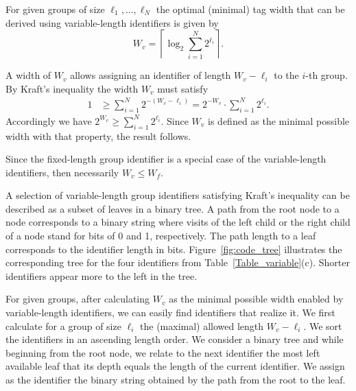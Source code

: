 \begin{property}
For given groups of size $\ell_1, \ldots, \ell_N$ the optimal (minimal) tag width that can be derived using variable-length identifiers is given by 
\begin{equation} \label{eq2}
W_{v}  = \left \lceil \log_2 \sum_{i = 1}^{N}{2^{\ell_i}} \right \rceil. \nonumber 
\end{equation}
\label{property_variable_length_minimal_tag}
\end{property} 
\bp A width of $W_{v}$ allows assigning an identifier of length $W_{v}
- \ell_i$ to the $i$-th group. By Kraft's inequality the width $W_{v}$
must satisfy
\begin{equation} \label{eq1}
\begin{split}
1 &\ge \sum_{i = 1}^{N}{2^{-(W_{v}-\ell_i)}} = 2^{-W_{v}} \cdot \sum_{i = 1}^{N}{2^{\ell_i}}. \nonumber 
\end{split}
\end{equation}
Accordingly we have $2^{W_{v}}  \ge \sum_{i = 1}^{N}{2^{\ell_i}}$. Since $W_{v}$ is defined as the minimal possible width with that property, the result follows.
\ep

 
Since the fixed-length group identifier is a special case of the
variable-length identifiers, then necessarily $W_{v} \le W_{f}$.

A selection of variable-length group identifiers satisfying Kraft's inequality can be described as a subset of leaves in a binary tree. 
A path from the root node to a node corresponds to a binary string where visits of the left child or the right child of a node stand for bits of 0 and 1, respectively. 
The path length  to a leaf corresponds to the identifier length in bits.
Figure~\ref{fig:code_tree} illustrates the corresponding tree for the four identifiers from Table~\ref{Table_variable}(c).
Shorter identifiers appear more to the left in the tree.

For given groups, after calculating $W_{v}$ as the minimal possible width enabled by variable-length identifiers, we can easily find identifiers that realize it. We first calculate for a group of size $\ell_i$ the (maximal) allowed length $W_{v} - \ell_i$. We sort the identifiers in an ascending length order. We consider a binary tree and while beginning from the root node, we relate to the next identifier the most left available leaf that its depth equals the length of the current identifier. We assign as the identifier the binary string obtained by the path from the root to the leaf.
 
